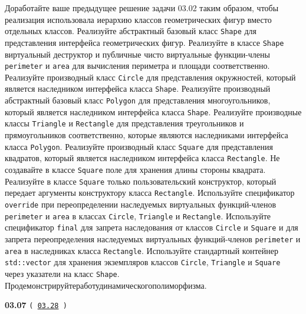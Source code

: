 \documentclass[a4paper,12pt]{article}
\begin{document}
Доработайте ваше предыдущее решение задачи 03.02 таким образом, чтобы реализация использовала иерархию классов геометрических фигур вместо отдельных классов. Реализуйте абстрактный базовый класс \lstinline{Shape} для представления интерфейса геометрических фигур. Реализуйте в классе \lstinline{Shape} виртуальный деструктор и публичные чисто виртуальные функции-члены \lstinline{perimeter} и \lstinline{area} для вычисления периметра и площади соответственно. Реализуйте производный класс \lstinline{Circle} для представления окружностей, который является наследником интерфейса класса \lstinline{Shape}. Реализуйте производный абстрактный базовый класс \lstinline{Polygon} для представления многоугольников, который является наследником интерфейса класса \lstinline{Shape}. Реализуйте производные классы \lstinline{Triangle} и \lstinline{Rectangle} для представления треугольников и прямоугольников соответственно, которые являются наследниками интерфейса класса \lstinline{Polygon}. Реализуйте производный класс \lstinline{Square} для представления квадратов, который является наследником интерфейса класса \lstinline{Rectangle}. Не создавайте в классе \lstinline{Square} поле для хранения длины стороны квадрата. Реализуйте в классе \lstinline{Square} только пользовательский конструктор, который передает аргументы конструктору класса \lstinline{Rectangle}. Используйте спецификатор \lstinline{override} при переопределении наследуемых виртуальных функций-членов \lstinline{perimeter} и \lstinline{area} в классах \lstinline{Circle}, \lstinline{Triangle} и \lstinline{Rectangle}. Используйте спецификатор \lstinline{final} для запрета наследования от классов \lstinline{Circle} и \lstinline{Square} и для запрета переопределения наследуемых виртуальных функций-членов \lstinline{perimeter} и \lstinline{area} в наследниках класса \lstinline{Rectangle}. Используйте стандартный контейнер \lstinline{std::vector} для хранения экземпляров классов \lstinline{Circle}, \lstinline{Triangle} и \lstinline{Square} через указатели на класс \lstinline{Shape}. Продемонстрируйте\:работу\:динамического\:полиморфизма.

\bigskip

{\large \textbf{03.07} \texttt{(\,\href{https://github.com/i-s-m-mipt/Education/blob/master/projects/examples/source/03.28.cpp}{03.28}\,)}}

\bigskip
\end{document}
